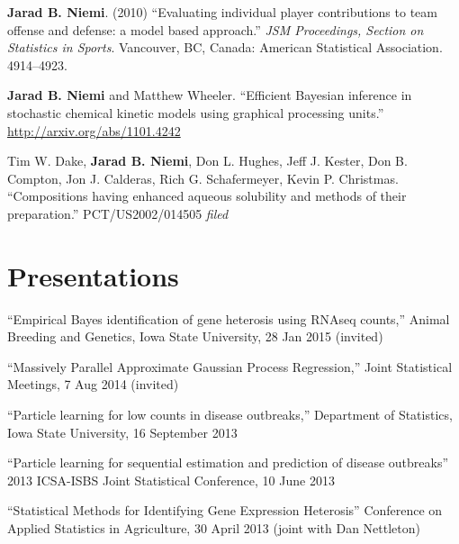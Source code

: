 \documentclass[overlapped,line]{res}
\begin{document}
\begin{resume}
{\bf Jarad B. Niemi}. (2010) ``Evaluating individual player contributions to team offense and defense: a model based approach.'' \emph{JSM Proceedings, Section on Statistics in Sports}. Vancouver, BC, Canada: American Statistical Association. 4914--4923.

{\bf Jarad B. Niemi} and Matthew Wheeler. ``Efficient Bayesian inference in stochastic chemical kinetic models using graphical processing units.'' \url{http://arxiv.org/abs/1101.4242}

Tim W. Dake, {\bf Jarad B. Niemi}, Don L. Hughes, Jeff J. Kester, Don B. Compton, Jon J. Calderas, Rich G. Schafermeyer, Kevin P. Christmas. ``Compositions having enhanced aqueous solubility and methods of their preparation.'' PCT/US2002/014505 \emph{filed}



\section{\bf Presentations}

%

{\small

``Empirical Bayes identification of gene heterosis using RNAseq counts,'' Animal Breeding and Genetics, Iowa State University, 28 Jan 2015 (invited)

``Massively Parallel Approximate Gaussian Process Regression,'' Joint Statistical Meetings, 7 Aug 2014 (invited)

``Particle learning for low counts in disease outbreaks,'' Department of Statistics, Iowa State University, 16 September 2013

``Particle learning for sequential estimation and prediction of disease outbreaks''  2013 ICSA-ISBS Joint Statistical Conference, 10 June 2013

``Statistical Methods for Identifying Gene Expression Heterosis'' Conference on Applied Statistics in Agriculture, 30 April 2013 (joint with Dan Nettleton)

}
\end{resume}
\end{document}
